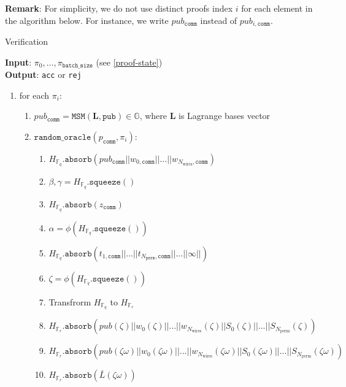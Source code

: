 \textbf{Remark}: For simplicity, we do not use distinct proofs index $i$ for each element in the algorithm below.
For instance, we write $pub_{\texttt{comm}}$ instead of $pub_{i, \texttt{comm}}$.

\begin{algorithm}[H]
    \caption{Verification}
    \textbf{Input}: $\pi_0, \dots, \pi_{\texttt{batch\_size}}$ (see \ref{proof-state}) \\
    \textbf{Output}: \texttt{acc} or \texttt{rej}
    \begin{enumerate}
        \item for each $\pi_i$:
        \begin{enumerate}
            \item $pub_{\texttt{comm}} = \texttt{MSM}(\textbf{L}, \texttt{pub}) \in \mathbb{G}$, where $\textbf{L}$ is Lagrange bases vector
            \item $\texttt{random\_oracle}(p_{\texttt{comm}}, \pi_i)$:
            \begin{enumerate}
                \item $H_{\mathbb{F}_q}.\texttt{absorb}(pub_{\texttt{comm}} || w_{0, \texttt{comm}} || ... || w_{N_{\text{wires}}, \texttt{comm}})$
                \item $\beta, \gamma = H_{\mathbb{F}_q}.\texttt{squeeze}()$
                \item $H_{\mathbb{F}_q}.\texttt{absorb}(z_{\texttt{comm}})$
                \item $\alpha = \phi(H_{\mathbb{F}_q}.\texttt{squeeze}())$
                \item $H_{\mathbb{F}_q}.\texttt{absorb}(t_{1, \texttt{comm}} ||  ... || t_{N_{\texttt{perm}}, \texttt{comm}} ||  ... || \infty ||)$
                \item $\zeta = \phi(H_{\mathbb{F}_q}.\texttt{squeeze}())$
                \item Transfrorm $H_{\mathbb{F}_q}$ to $H_{\mathbb{F}_r}$
                \item $H_{\mathbb{F}_r}.\texttt{absorb}(pub(\zeta) || w_{0}(\zeta) || ... || w_{N_{\text{wires}}}(\zeta)
                || S_0(\zeta) || ... || S_{N_{\text{perm}}}(\zeta))$
                \item $H_{\mathbb{F}_r}.\texttt{absorb}(pub(\zeta\omega) || w_{0}(\zeta\omega) || ... || w_{N_{\text{wires}}}(\zeta\omega)
                || S_0(\zeta\omega) || ... || S_{N_{\text{perm}}}(\zeta\omega))$
                \item $H_{\mathbb{F}_r}.\texttt{absorb}(\bar{L}(\zeta\omega))$

\end{enumerate}
\end{enumerate}
\end{enumerate}
\end{algorithm}
